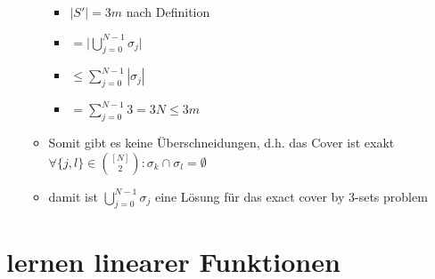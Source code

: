 \documentclass[12pt,a4paper]{article}
\begin{document}
\begin{itemize}
\begin{itemize}
\begin{itemize}
\item $|S'| = 3m$ nach Definition
\item $\displaystyle = \big\vert \bigcup_{j=0}^{N-1} \sigma_j \big\vert$
\item $\displaystyle \leq \sum_{j=0}^{N-1} |\sigma_j |$
\item $\displaystyle = \sum_{j=0}^{N-1} 3 = 3N \leq 3m$
\end{itemize}
\item Somit gibt es keine Überschneidungen, d.h. das Cover ist exakt\\
$\forall\{j,l\}\in\binom{[N]}{2}: \sigma_k\cap\sigma_l = \emptyset$
\item damit ist $\displaystyle \bigcup_{j=0}^{N-1} \sigma_j$ eine Lösung für das exact cover by 3-sets problem
\end{itemize}
\end{itemize}
\section{lernen linearer Funktionen}
\end{document}
